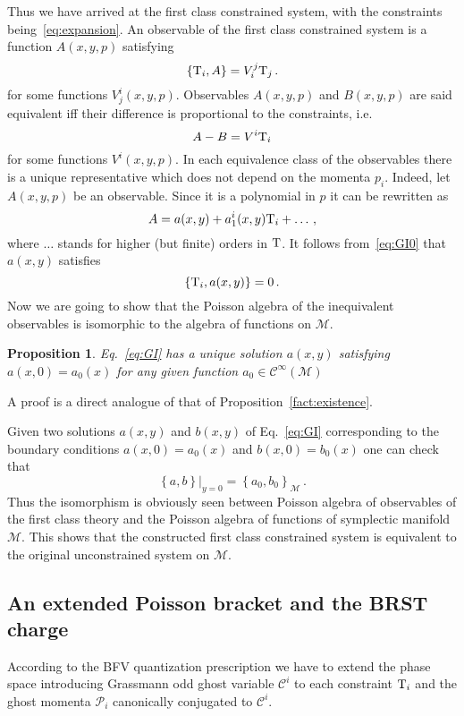 \documentclass[a4paper,11pt,oneside]{amsart}
\theoremstyle{plain}
\numberwithin{equation}{section} %
\numberwithin{figure}{section} %
\newtheorem{fact}{Proposition}[section]
\newcommand{\pb}[2]{\left\{{}#1{},{}#2{}\right\}}
\newcommand{\func}[1]{{{\mathcal C}^\infty}{(#1)}}             %
\def\cP{{\mathcal P}}
\def\cc{{\mathcal C}}
\def\cT{{\rm T}}
\def\manM{{\mathcal M}}
\begin{document}
\noindent
Thus we have arrived at the first class constrained system,
with the constraints being~\eqref{eq:expansion}.  An
observable of the first class constrained system
is a function $A(x,y,p)$ satisfying
\begin{equation}
\label{eq:GI0}
\pb{\cT_i}{A}=V_i^j\cT_j\,.
\end{equation}
for some functions $V^i_j(x,y,p)$.  Observables $A(x,y,p)$ and
$B(x,y,p)$ are said equivalent iff
their difference is proportional to the constraints, i.e.
\begin{equation}
A-B=V^i\cT_i
\end{equation}
for some functions $V^i(x,y,p)$.  In each equivalence class of the
observables there is a unique representative which does not depend
on the momenta $p_i$.  Indeed, let $A(x,y,p)$ be an
observable.  Since it is a polynomial in $p$ it can be rewritten as
\begin{equation}
A=a(x,y)+a^i_1(x,y)\cT_i+\ldots\,,
\end{equation}
where $\ldots$ stands for higher (but finite) orders in
$\cT$.  It follows from~\eqref{eq:GI0} that $a(x,y)$ satisfies
\begin{equation}
\label{eq:GI} \pb{\cT_i}{a(x,y)}=0\,.
\end{equation}
Now we are going to show that the
Poisson algebra of the inequivalent observables is isomorphic
to the algebra of functions on $\manM$.
\begin{fact}
\label{fact:extention}
Eq.~\eqref{eq:GI} has a unique solution $a(x,y)$ satisfying
$a(x,0)=a_0(x)$ for any given function $a_0 \in \func\manM$
\end{fact}
\noindent
A proof is a direct analogue of that of
Proposition~\eqref{fact:existence}.

\noindent
Given two solutions $a(x,y)$ and
$b(x,y)$ of Eq.~\eqref{eq:GI} corresponding to the
boundary conditions $a(x,0)=a_0(x)$ and $b(x,0)=b_0(x)$ one
can check that
\begin{equation}
         \pb{a}{b}|_{y=0}=\pb{a_0}{b_0}_{\manM}\,.
\end{equation}
Thus the isomorphism is obviously seen between Poisson algebra
of observables of the first class theory and the Poisson algebra
of functions of symplectic manifold $\manM$.  This
shows that the constructed first class constrained
system is equivalent to the original unconstrained
system on $\manM$.

\subsection{An extended Poisson bracket and the BRST charge}
According to the BFV quantization prescription we
have to extend the phase space introducing
Grassmann odd ghost variable $\cc^i$ to each constraint
$\cT_i$ and the ghost momenta $\cP_i$ canonically conjugated
to $\cc^i$.
\end{document}
